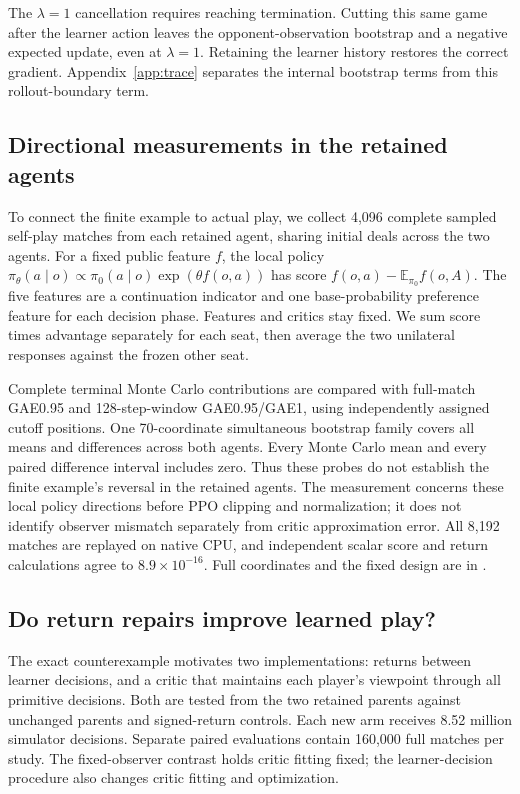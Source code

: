 The $\lambda=1$ cancellation requires reaching termination. Cutting this same
game after the learner action leaves the opponent-observation bootstrap and
a negative expected update, even at $\lambda=1$. Retaining the learner history
restores the correct gradient. Appendix~\ref{app:trace} separates the internal
bootstrap terms from this rollout-boundary term.

\subsection{Directional measurements in the retained agents}
\label{sec:directional}
To connect the finite example to actual play, we collect 4,096 complete sampled
self-play matches from each retained agent, sharing initial deals across the
two agents. For a fixed public feature $f$, the local policy
$\pi_\theta(a\mid o)\propto\pi_0(a\mid o)\exp(\theta f(o,a))$ has score
$f(o,a)-\mathbb E_{\pi_0}f(o,A)$. The five features are a continuation indicator
and one base-probability preference feature for each decision phase. Features
and critics stay fixed. We sum score times advantage separately for each seat,
then average the two unilateral responses against the frozen other seat.

Complete terminal Monte Carlo contributions are compared with full-match
GAE0.95 and 128-step-window GAE0.95/GAE1, using independently assigned cutoff
positions. One 70-coordinate simultaneous bootstrap family covers all means
and differences across both agents. Every Monte Carlo mean and every paired
difference interval includes zero. Thus these probes do not establish the
finite example's reversal in the retained agents. The measurement concerns
these local policy directions before PPO clipping and normalization; it does
not identify observer mismatch separately from critic approximation error.
All 8,192 matches are replayed on native CPU, and independent scalar score and
return calculations agree to $8.9\times10^{-16}$. Full coordinates and the
fixed design are in .

\subsection{Do return repairs improve learned play?}
The exact counterexample motivates two implementations: returns between
learner decisions, and a critic that maintains each player's viewpoint through
all primitive decisions. Both are tested from the two retained parents against
unchanged parents and signed-return controls. Each new arm receives
8.52 million simulator decisions. Separate paired evaluations contain 160,000
full matches per study. The fixed-observer contrast holds critic fitting fixed;
the learner-decision procedure also changes critic fitting and optimization.

